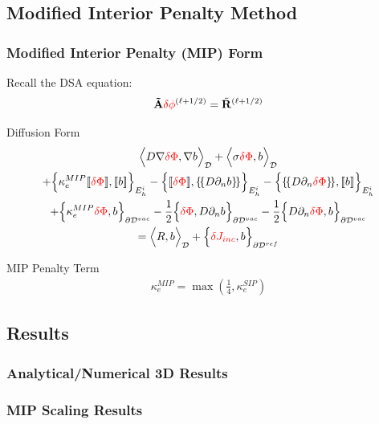 \documentclass[compress,10pt]{beamer}
\renewcommand{\vec}[1]{\mathbf{#1}}
\newcommand{\tcr}[1]{\textcolor{red}{#1}}
\begin{document}
\subsection{Modified Interior Penalty Method}
\begin{frame}[t]\frametitle{Modified Interior Penalty (MIP) Form}

Recall the DSA equation:
\begin{equation*}
{\bf \tilde{A}} \tcr{\delta \phi}^{(\ell+1/2)} = \tilde{{\bf R}}^{(\ell+1/2)}
\end{equation*}

\begin{block}{Diffusion Form}{\footnotesize
\begin{gather*}
\Big<  D \vec{\nabla} \tcr{\delta \Phi} , \vec{\nabla} b  \Big>_{\mathcal{D}} 
+ \Big<  \sigma \tcr{\delta  \Phi} ,  b  \Big>_{\mathcal{D}}    \\
+ \Big\{ \kappa_e^{MIP} [\![ \tcr{\delta  \Phi} ]\!] , [\![  b ]\!]\Big\}_{E_h^i} 
- \Big\{  [\![  \tcr{\delta \Phi} ]\!] , \{\!\{  D \partial_n b \}\!\}\Big\}_{E_h^i} 
- \Big\{ \{\!\{  D \partial_n \tcr{\delta \Phi} \}\!\} , [\![ b ]\!]\Big\}_{E_h^i} \\
+ \Big\{ \kappa_e^{MIP} \tcr{\delta \Phi} ,   b \Big\}_{\partial \mathcal{D}^{vac}} -  \frac{1}{2} \Big\{  \tcr{\delta \Phi}  ,  D \partial_n b \Big\}_{\partial \mathcal{D}^{vac}} -  \frac{1}{2} \Big\{   D \partial_n \tcr{\delta \Phi} ,   b \Big\}_{\partial \mathcal{D}^{vac}}  \\
 = \Big<  R , b  \Big>_{\mathcal{D}}  +  \Big\{  \tcr{\delta J_{inc}}, b  \Big\}_{\partial \mathcal{D}^{ref}}
\end{gather*} }
\end{block}
	\begin{block}{MIP Penalty Term}{\footnotesize
		\begin{align*}
			\kappa_e^{MIP} = \max(\frac{1}{4},  \kappa_e^{SIP})
		\end{align*} }
	\end{block}
\end{frame}
\subsection{Results}
\begin{frame}[t]\frametitle{Analytical/Numerical 3D Results}

\end{frame}
\begin{frame}[t]\frametitle{MIP Scaling Results}

\end{frame}
\typeout{***********************************************************************************}
\end{document}
